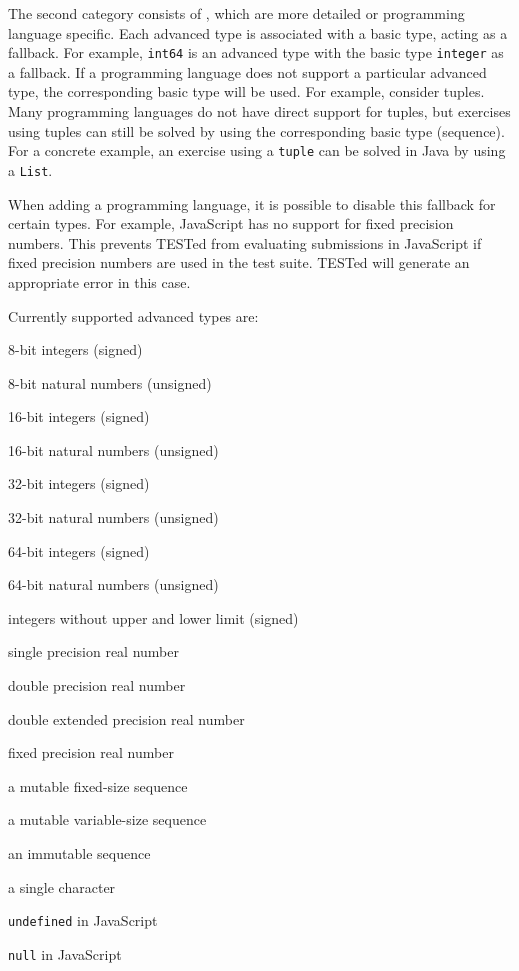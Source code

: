 \documentclass[../main]{subfiles}
\begin{document}
The second category consists of , which are more detailed or programming language specific.
Each advanced type is associated with a basic type, acting as a fallback.
For example, \texttt{int64} is an advanced type with the basic type \texttt{integer} as a fallback.
If a programming language does not support a particular advanced type, the corresponding basic type will be used.
For example, consider tuples.
Many programming languages do not have direct support for tuples, but exercises using tuples can still be solved by using the corresponding basic type (sequence).
For a concrete example, an exercise using a \texttt{tuple} can be solved in Java by using a \texttt{List}.

When adding a programming language, it is possible to disable this fallback for certain types.
For example, JavaScript has no support for fixed precision numbers.
This prevents TESTed from evaluating submissions in JavaScript if fixed precision numbers are used in the test suite.
TESTed will generate an appropriate error in this case.

Currently supported advanced types are:

\begin{description}[noitemsep]
    \item[\texttt{int8}] 8-bit integers (signed)
    \item[\texttt{uint8}] 8-bit natural numbers (unsigned)
    \item[\texttt{int16}] 16-bit integers (signed)
    \item[\texttt{uint16}] 16-bit natural numbers (unsigned)
    \item[\texttt{int32}] 32-bit integers (signed)
    \item[\texttt{uint32}] 32-bit natural numbers (unsigned)
    \item[\texttt{int64}] 64-bit integers (signed)
    \item[\texttt{uint64}] 64-bit natural numbers (unsigned)
    \item[\texttt{bigint}] integers without upper and lower limit (signed)
    \item[\texttt{single\_precision}] single precision real number
    \item[\texttt{double\_precision}] double precision real number
    \item[\texttt{double\_extended}] double extended precision real number
    \item[\texttt{fixed\_precision}] fixed precision real number
    \item[\texttt{array}] a mutable fixed-size sequence
    \item[\texttt{list}] a mutable variable-size sequence
    \item[\texttt{tuple}] an immutable sequence
    \item[\texttt{char}] a single character
    \item[\texttt{undefined}] \texttt{undefined} in JavaScript
    \item[\texttt{null}] \texttt{null} in JavaScript
\end{description}
\end{document}
